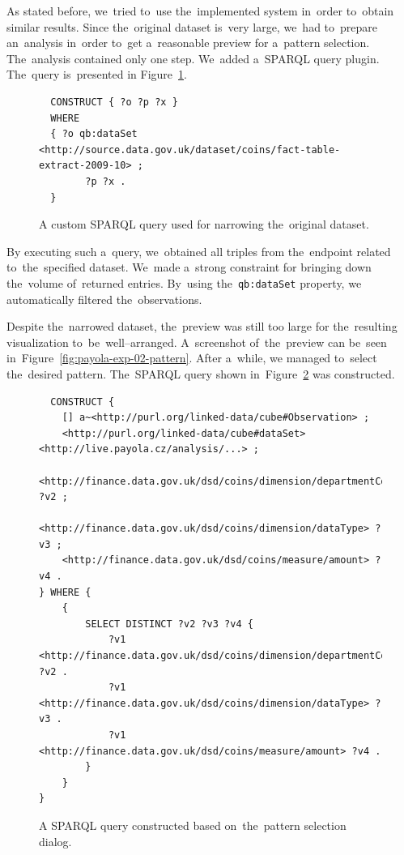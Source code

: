 As stated before, we~tried to~use the~implemented system in~order to~obtain 
similar results. Since the~original dataset is~very large, we~had to~prepare an~analysis in~order to~get a~reasonable preview for a~pattern selection. The~analysis contained only one step. We~added a~SPARQL query plugin. The~query is~presented
in Figure~\ref{fig:coins-query-narrow}.

\begin{figure}
  \scriptsize
\begin{verbatim}
  CONSTRUCT { ?o ?p ?x }
  WHERE
  { ?o qb:dataSet <http://source.data.gov.uk/dataset/coins/fact-table-extract-2009-10> ;
        ?p ?x .
  }
\end{verbatim}
\caption{A custom SPARQL query used for narrowing the~original dataset.}
\label{fig:coins-query-narrow}
\end{figure}

By executing such a~query, we~obtained all triples from the~endpoint 
related to~the~specified dataset. We~made a~strong constraint for bringing 
down the~volume of~returned entries. By~using the~\texttt{qb:dataSet} property, 
we automatically filtered the~observations.

Despite the~narrowed dataset, the~preview was still too large 
for the~resulting visualization to~be~well--arranged. A~screenshot of~the~preview can be~seen in~Figure~\ref{fig:payola-exp-02-pattern}. After a~while,
we managed to~select the~desired 
pattern. The~SPARQL query shown in~Figure~\ref{fig:coins-pattern-result} was 
constructed.

\begin{figure}
  \scriptsize
\begin{verbatim}
  CONSTRUCT {
    [] a~<http://purl.org/linked-data/cube#Observation> ;
    <http://purl.org/linked-data/cube#dataSet> <http://live.payola.cz/analysis/...> ;
    <http://finance.data.gov.uk/dsd/coins/dimension/departmentCode> ?v2 ;
    <http://finance.data.gov.uk/dsd/coins/dimension/dataType> ?v3 ;
    <http://finance.data.gov.uk/dsd/coins/measure/amount> ?v4 .
} WHERE {
    {
        SELECT DISTINCT ?v2 ?v3 ?v4 {
            ?v1 <http://finance.data.gov.uk/dsd/coins/dimension/departmentCode> ?v2 .
            ?v1 <http://finance.data.gov.uk/dsd/coins/dimension/dataType> ?v3 .
            ?v1 <http://finance.data.gov.uk/dsd/coins/measure/amount> ?v4 .
        }
    }
} 
\end{verbatim}
\caption{A SPARQL query constructed based on~the~pattern selection dialog.}
\label{fig:coins-pattern-result}
\end{figure}

